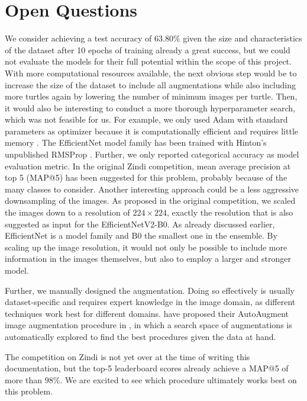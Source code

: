 \section{Open Questions}

We consider achieving a test accuracy of $63.80\%$ given the size and characteristics of the dataset after 10 epochs of training already a great success, but we could not evaluate the models for their full potential within the scope of this project. With more computational resources available, the next obvious step would be to increase the size of the dataset to include all augmentations while also including more turtles again by lowering the number of minimum images per turtle. Then, it would also be interesting to conduct a more thorough hyperparameter search, which was not feasible for us. For example, we only used Adam with standard parameters as optimizer because it is computationally efficient and requires little memory \citep{Kingma2014}. The EfficientNet model family has been trained with Hinton's unpublished RMSProp \citep{Tan2019}. Further, we only reported categorical accuracy as model evaluation metric. In the original Zindi competition, mean average precision at top 5 (MAP@5) has been suggested for this problem, probably because of the many classes to consider. Another interesting approach could be a less aggressive downsampling of the images. As proposed in the original competition, we scaled the images down to a resolution of $224\times224$, exactly the resolution that is also suggested as input for the EfficientNetV2-B0. As already discussed earlier, EfficientNet is a model family and B0 the smallest one in the ensemble. By scaling up the image resolution, it would not only be possible to include more information in the images themselves, but also to employ a larger and stronger model.

Further, we manually designed the augmentation. Doing so effectively is usually dataset-specific and requires expert knowledge in the image domain, as different techniques work best for different domains. \citeauthor{Cubuk2018} have proposed their AutoAugment image augmentation procedure in \citeyear{Cubuk2018}, in which a search space of augmentations is automatically explored to find the best procedures given the data at hand.

The competition on Zindi is not yet over at the time of writing this documentation, but the top-5 leaderboard scores already achieve a MAP@5 of more than $98\%$. We are excited to see which procedure ultimately works best on this problem.